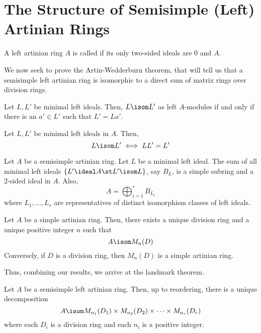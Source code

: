 \documentclass[11pt,leqno,oneside]{amsbook}
\numberwithin{thm}{section}
\begin{document}
\section{The Structure of Semisimple (Left) Artinian Rings}
\begin{defn}
  A left artinian ring \(A\) is called  if its only
  two-sided ideals
  are \(0\) and \(A\).
\end{defn}
We now seek to prove the Artin-Wedderburn theorem, that will tell us
that a semisimple left artinian ring is isomorphic to a direct sum of
matrix rings over division rings.
\begin{lem}
  Let \(L,L'\) be minimal left ideals. Then, \(L \isom L'\) as left
  \(A\)-modules if and only if there is an \(a' \in L'\) such that
  \(L' = La'\).
\end{lem}
\begin{lem}
  Let \(L,L'\) be minimal left ideals in \(A\). Then, \[
    L \isom L' \iff LL' = L'
  \]
\end{lem}
\begin{thm}[Wedderburn]
  Let \(A\) be a semisimple artinian ring. Let \(L\) be a minimal left
  ideal. The sum of all minimal left ideals \(\{L' \ideal A
  \st L' \isom L\}\), say \(B_L\), is a simple subring and a
  \(2\)-sided ideal in \(A\). Also, \[
    A = \bigoplus_{i=1}^r B_{L_i}
  \]
  where \(L_1, \ldots, L_r\) are representatives of distinct
  isomorphism classes of left ideals.
\end{thm}
\begin{thm}[Wedderburn]
  Let \(A\) be a simple artinian ring. Then, there exists a unique
  division ring and a unique positive integer \(n\) such that \[
    A \isom M_n(D)
  \]
  Conversely, if \(D\) is a division ring, then \(M_n(D)\) is a simple
  artinian ring. 
\end{thm}
Thus, combining our results, we arrive at the landmark theorem.
\begin{thm}
  Let \(A\) be a semisimple left artinian ring. Then, up to reordering,
  there is a unique decomposition \[
    A \isom M_{n_1}(D_1) \times M_{n_2}(D_2) \times \cdots \times M_{n_r}(D_r)
  \]
  where each \(D_i\) is a division ring and each \(n_i\) is a positive
  integer.
\end{thm}
\begin{bibdiv}
  \begin{biblist}
  \end{biblist}
\end{bibdiv}
\end{document}
